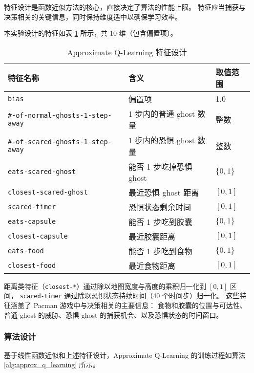 特征设计是函数近似方法的核心，直接决定了算法的性能上限。
特征应当捕获与决策相关的关键信息，同时保持维度适中以确保学习效率。

本实验设计的特征如表 \ref{tab:features} 所示，共 10 维（包含偏置项）。

\begin{table}[h]
    \renewcommand{\arraystretch}{1.5}
    \setlength{\tabcolsep}{8pt}
    \centering
    \caption{Approximate Q-Learning 特征设计}
    \small
    \begin{tabular}{lll}
        \toprule
        \textbf{特征名称} & \textbf{含义} & \textbf{取值范围} \\
        \midrule
        \texttt{bias} & 偏置项 & 1.0 \\
        \midrule
        \texttt{\#-of-normal-ghosts-1-step-away} & 1 步内的普通 ghost 数量 & 整数 \\
        \texttt{\#-of-scared-ghosts-1-step-away} & 1 步内的恐惧 ghost 数量 & 整数 \\
        \texttt{eats-scared-ghost} & 能否 1 步吃掉恐惧 ghost & $\{0, 1\}$ \\
        \texttt{closest-scared-ghost} & 最近恐惧 ghost 距离 & $[0, 1]$ \\
        \texttt{scared-timer} & 恐惧状态剩余时间 & $[0, 1]$ \\
        \midrule
        \texttt{eats-capsule} & 能否 1 步吃到胶囊 & $\{0, 1\}$ \\
        \texttt{closest-capsule} & 最近胶囊距离 & $[0, 1]$ \\
        \midrule
        \texttt{eats-food} & 能否 1 步吃到食物 & $\{0, 1\}$ \\
        \texttt{closest-food} & 最近食物距离 & $[0, 1]$ \\
        \bottomrule
    \end{tabular}
    \label{tab:features}
\end{table}

距离类特征（\texttt{closest-*}）通过除以地图宽度与高度的乘积归一化到 $[0,1]$ 区间，
\texttt{scared-timer} 通过除以恐惧状态持续时间（40 个时间步）归一化。
这些特征涵盖了 Pacman 游戏中与决策相关的主要信息：
食物和胶囊的位置与可达性、普通 ghost 的威胁、恐惧 ghost 的捕获机会、以及恐惧状态的时间窗口。

\subsubsection{算法设计}

基于线性函数近似和上述特征设计，Approximate Q-Learning 的训练过程如算法 \ref{alg:approx_q_learning} 所示。

